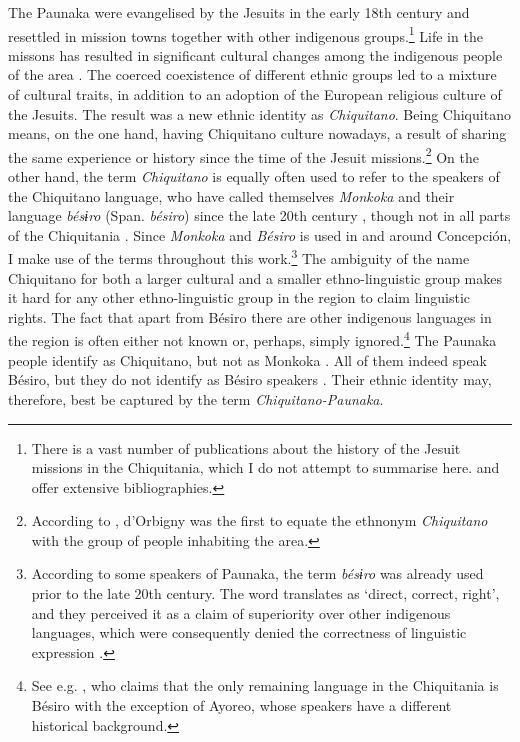 The Paunaka were evangelised by the Jesuits in the early 18th century and resettled in mission towns together with other indigenous groups.\footnote{There is a vast number of publications about the history of the Jesuit missions in the Chiquitania, which I do not attempt to summarise here. \citet[]{TomichaCharupa2002} and \citet[]{MatienzoAL2011} offer extensive bibliographies.} Life in the missons has resulted in significant cultural changes among the indigenous people of the area \citep[7]{Tonelli2004}. The coerced coexistence of different ethnic groups led to a mixture of cultural traits, in addition to an adoption of the European religious culture of the Jesuits. The result was a new ethnic identity as \textit{Chiquitano}. Being Chiquitano means, on the one hand, having Chiquitano culture nowadays, a result of sharing the same experience or history since the time of the Jesuit missions.\footnote{According to \citet[247]{Martinez2015}, d'Orbigny was the first to equate the ethnonym \textit{Chiquitano} with the group of people inhabiting the area.}  On the other hand, the term \textit{Chiquitano} is equally often used to refer to the speakers of the Chiquitano language, who have called themselves \textit{Monkoka} and their language \textit{bésɨro} (Span. \textit{bésiro}) since the late 20th century \citep[cf.][1]{Sans2013}, though not in all parts of the Chiquitania \citep[cf.][478]{Adelaar2004}. Since \textit{Monkoka} and \textit{Bésiro} is used in and around Concepción, I make use of the terms throughout this work.\footnote{According to some speakers of Paunaka, the term \textit{bésɨro} was already used prior to the late 20th century. The word translates as ‘direct, correct, right’, and they perceived it as a claim of superiority over other indigenous languages, which were consequently denied the correctness of linguistic expression \citep[10]{Villalta2013}.} The ambiguity of the name Chiquitano for both a larger cultural and a smaller ethno-linguistic group makes it hard for any other ethno-linguistic group in the region to claim linguistic rights. The fact that apart from Bésiro there are other indigenous languages in the region is often either not known or, perhaps, simply ignored.\footnote{See e.g. \citet[86]{Tonelli2004}, who claims that the only remaining language in the Chiquitania is Bésiro with the exception of Ayoreo, whose speakers have a different historical background.} 
The Paunaka people identify as Chiquitano, but not as Monkoka \citep[8]{Villalta2013}. All of them indeed speak Bésiro, but they do not identify as Bésiro speakers \citep[11]{Villalta2013}. Their ethnic identity may, therefore, best be captured by the term \textit{Chiquitano-Paunaka}.

